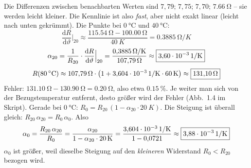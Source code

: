 \documentclass[11pt,a4paper]{article}
\begin{document}
\begin{loesung}
\begin{center}
\end{center}
Die Differenzen zwischen benachbarten Werten sind $7{,}79$; $7{,}75$; $7{,}70$; $\SI{7.66}{\ohm}$ -- sie werden leicht kleiner. Die Kennlinie ist also \emph{fast}, aber nicht exakt linear (leicht nach unten gekrümmt).
Die Punkte bei $\SI{0}{\celsius}$ und $\SI{40}{\celsius}$:
\[
  \frac{\mathrm{d}R}{\mathrm{d}\vartheta}\Big|_{20} \approx \frac{\SI{115.54}{\ohm} - \SI{100.00}{\ohm}}{\SI{40}{K}} = \SI{0.3885}{\ohm/K}
\]
\[
  \alpha_{20} = \frac{1}{R_{20}}\cdot\frac{\mathrm{d}R}{\mathrm{d}\vartheta}\Big|_{20} = \frac{\SI{0.3885}{\ohm/K}}{\SI{107.79}{\ohm}} \approx \boxed{\SI{3.60e-3}{1/K}}
\]
\[
  R(\SI{80}{\celsius}) \approx \SI{107.79}{\ohm}\cdot\bigl(1 + \SI{3.604e-3}{1/K}\cdot\SI{60}{K}\bigr) \approx \boxed{\SI{131.10}{\ohm}}
\]
Fehler: $\SI{131.10}{\ohm} - \SI{130.90}{\ohm} = \SI{0.20}{\ohm}$, also etwa $\SI{0.15}{\percent}$. Je weiter man sich von der Bezugstemperatur entfernt, desto größer wird der Fehler (Abb.~1.4 im Skript).
Gerade bei $\SI{0}{\celsius}$: $R_0 = R_{20}\,(1 - \alpha_{20}\cdot\SI{20}{K})$. Die Steigung ist überall gleich: $R_{20}\,\alpha_{20} = R_0\,\alpha_0$. Also
\[
  \alpha_0 = \frac{R_{20}\,\alpha_{20}}{R_0} = \frac{\alpha_{20}}{1 - \alpha_{20}\cdot\SI{20}{K}}
  = \frac{\SI{3.604e-3}{1/K}}{1 - 0{,}0721} \approx \boxed{\SI{3.88e-3}{1/K}}
\]
$\alpha_0$ ist größer, weil dieselbe Steigung auf den \emph{kleineren} Widerstand $R_0 < R_{20}$ bezogen wird.
\end{loesung}
\end{document}
